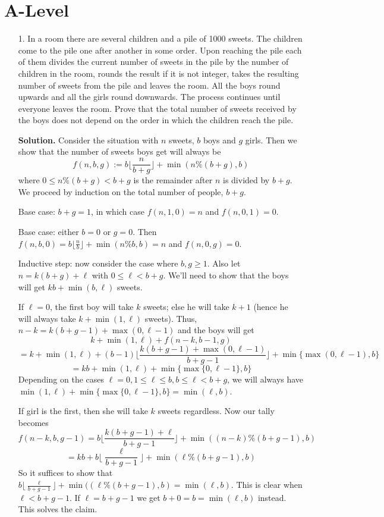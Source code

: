 \documentclass[11pt,a4paper]{article}
\begin{document}
\section*{A-Level}
\begin{enumerate}
	\item[1.] In a room there are several children and a pile of 1000 sweets. The children come to the pile one
	after another in some order. Upon reaching the pile each of them divides the current number of
	sweets in the pile by the number of children in the room, rounds the result if it is not integer, takes
	the resulting number of sweets from the pile and leaves the room. All the boys round upwards and
	all the girls round downwards. The process continues until everyone leaves the room. Prove that the
	total number of sweets received by the boys does not depend on the order in which the children
	reach the pile.
	
	\textbf{Solution.}
	Consider the situation with $n$ sweets, $b$ boys and $g$ girls. Then we show that the number of sweets boys get will always be
	\[
	f(n, b, g) := b\lfloor \frac{n}{b+g}\rfloor + \min(n\% (b+g), b)
	\]
	where $0\le n\% (b+g) < b+g$ is the remainder after $n$ is divided by $b+g$. 
	We proceed by induction on the total number of people, $b+g$. 
	
	Base case: $b+g=1$, in which case $f(n, 1, 0)=n$ and $f(n, 0, 1)=0$. 
	
	Base case: either $b=0$ or $g=0$. Then $f(n, b, 0)=b\lfloor \frac{n}{b}\rfloor +\min(n\%b, b)=n$
	and $f(n, 0, g)=0$. 
	
	Inductive step: now consider the case where $b, g\ge 1$. 
	Also let $n = k(b+g)+\ell$ with $0\le \ell < b+g$. 
	We'll need to show that the boys will get $kb+\min(b, \ell)$ sweets. 
	
	If $\ell=0$, the first boy will take $k$ sweets; else he will take $k+1$ (hence he will always take $k+\min(1, \ell)$ sweets). 
	Thus, $n-k=k(b+g-1)+\max(0, \ell-1)$ and the boys will get
	\[
	k + \min(1, \ell)
	+f(n-k, b-1, g)
	\]\[
	=k + \min(1, \ell)+(b-1)\lfloor\frac{k(b+g-1)+\max(0, \ell-1)}{b+g-1}\rfloor
	+\min\{\max(0, \ell-1), b\}
	\]
	\[
	=kb + \min(1, \ell)+\min \{\max \{0, \ell-1\}, b\}
	\]
	Depending on the cases $\ell=0, 1\le\ell\le b, b\le \ell < b+g$, we will always have 
	$\min(1, \ell)+\min \{\max \{0, \ell-1\}, b\}=\min(\ell, b)$. 
	
	If girl is the first, then she will take $k$ sweets regardless. Now our tally becomes 
	\[
	f(n-k, b, g-1)
	=b\lfloor\frac{k(b+g-1)+\ell}{b+g-1}\rfloor + \min((n-k)\%(b+g-1), b)
	\]
	\[
	=kb+b\lfloor\frac{\ell}{b+g-1}\rfloor + \min(\ell\%(b+g-1), b)
	\]
	So it suffices to show that $b\lfloor\frac{\ell}{b+g-1}\rfloor + \min((\ell\%(b+g-1), b)=\min(\ell, b)$. 
	This is clear when $\ell<b+g-1$. 
	If $\ell=b+g-1$ we get $b+0=b=\min(\ell, b)$ instead. This solves the claim. 
	

\end{enumerate}
\end{document}
